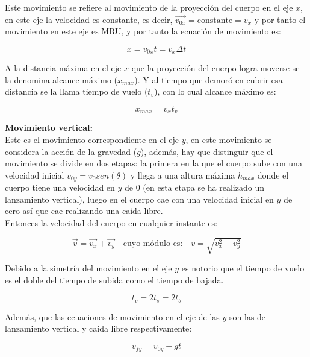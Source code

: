 Este movimiento se refiere al movimiento de la proyección del cuerpo en el eje $x$, en este eje la velocidad es constante, es 
decir, $\vec{v_{0x}} =  \text{constante} = v_x$ y por tanto el movimiento en este eje es MRU, y por tanto la ecuación de 
movimiento es:

\begin{equation}
 x = v_{0x}t=v_x \Delta t
\end{equation}

A la distancia máxima en el eje $x$ que la proyección del cuerpo logra moverse se la denomina alcance máximo ($x_{max}$). Y al 
tiempo que demoró en cubrir esa distancia se la llama tiempo de vuelo ($t_v$), con lo cual alcance máximo es:

\begin{equation}
 x_{max} =  v_x t_v
\end{equation}

\textbf{Movimiento vertical:}\\

Este es el movimiento correspondiente en el eje $y$, en este movimiento se considera la acción de la gravedad ($g$), además, hay 
que distinguir que el movimiento se divide en dos etapas: la primera en la que el cuerpo sube con una velocidad inicial $v_{0y} = 
 v_0 sen(\theta)$ y llega a una altura máxima $h_{max}$ donde el cuerpo tiene una velocidad en $y$ de 0 (en esta etapa se ha 
realizado un lanzamiento vertical), luego en el cuerpo cae con una velocidad inicial en $y$ de cero así que cae realizando una 
caída libre.\\

Entonces la velocidad del cuerpo en cualquier instante es:

\begin{equation}
 \vec{v} = \vec{v_x} + \vec{v_y}\quad \text{cuyo módulo es:} \quad v = \sqrt{v_x^2+v_y^2}
\end{equation}

Debido a la simetría del movimiento en el eje $y$ es notorio que el tiempo de vuelo es el doble del tiempo de subida como el 
tiempo de bajada.

\begin{equation}
 t_v = 2t_s =2t_b
\end{equation}

Además, que las ecuaciones de movimiento en el eje de las $y$ son las de lanzamiento vertical y caída libre respectivamente:

\begin{equation}
 v_{fy} = v_{0y} + gt
\end{equation}


